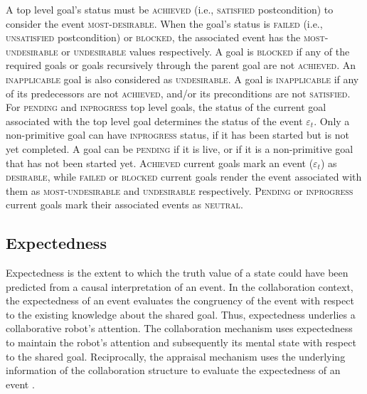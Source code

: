 \documentclass[12pt]{report}
\begin{document}

A top level goal's status must be \textsc{achieved} (i.e., \textsc{satisfied}
postcondition) to consider the event \textsc{most-desirable}. When the goal's
status is \textsc{failed} (i.e., \textsc{unsatisfied} postcondition) or
\textsc{blocked}, the associated event has the \textsc{most-undesirable} or
\textsc{undesirable} values respectively. A goal is \textsc{blocked} if any of
the required goals or goals recursively through the parent goal are not
\textsc{achieved}. An \textsc{inapplicable} goal is also considered as
\textsc{undesirable}. A goal is \textsc{inapplicable} if any of its predecessors
are not \textsc{achieved}, and/or its preconditions are not \textsc{satisfied}.
For \textsc{pending} and \textsc{inprogress} top level goals, the status of the
current goal associated with the top level goal determines the status of the
event $\varepsilon_t$. Only a non-primitive goal can have \textsc{inprogress}
status, if it has been started but is not yet completed. A goal can be
\textsc{pending} if it is live, or if it is a non-primitive goal that has not
been started yet. \textsc{Achieved} current goals mark an event
($\varepsilon_t$) as \textsc{desirable}, while \textsc{failed} or
\textsc{blocked} current goals render the event associated with them as
\textsc{most-undesirable} and \textsc{undesirable} respectively.
\textsc{Pending} or \textsc{inprogress} current goals mark their associated
events as \textsc{neutral}.

\subsection{Expectedness}
Expectedness is the extent to which the truth value of a state could have been
predicted from a causal interpretation of an event. In the collaboration
context, the expectedness of an event evaluates the congruency of the event with
respect to the existing knowledge about the shared goal. Thus, expectedness
underlies a collaborative robot's attention. The collaboration mechanism uses
expectedness to maintain the robot's attention and subsequently its mental state
with respect to the shared goal. Reciprocally, the appraisal mechanism uses the
underlying information of the collaboration structure to evaluate the
expectedness of an event \cite{shayganfar:appraisal-short}.
\end{document}
